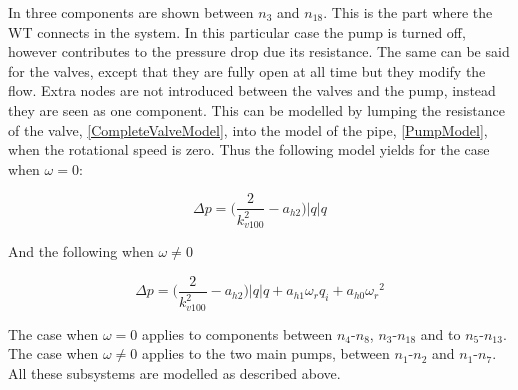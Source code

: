 In  three components are shown between $n_3$ and $n_{18}$. This is the part where the WT connects in the system. In this particular case the pump is turned off, however contributes to the pressure drop due its resistance. The same can be said for the valves, except that they are fully open at all time but they modify the flow. Extra nodes are not introduced between the valves and the pump, instead they are seen as one component. This can be modelled by lumping the resistance of the valve, \eqref{CompleteValveModel}, into the model of the pipe, \eqref{PumpModel}, when the rotational speed is zero. Thus the following model yields for the case when $\omega = 0$:

\begin{equation}
  \Delta p = \Big(\frac{2}{k_{v100}^2} - a_{h2}\Big)|q| q 
  \label{omega_zero}
\end{equation}

And the following when $\omega \neq 0$

\begin{equation}
  \Delta p = \Big(\frac{2}{k_{v100}^2} - a_{h2}\Big)|q| q  + a_{h1} \omega_r q_i + a_{h0}{\omega_r}^2
  \label{omega_notzero}
\end{equation}

The case when $\omega = 0$ applies to components between $n_4$-$n_8$, $n_3$-$n_{18}$  and to $n_5$-$n_{13}$. The case when $\omega \neq 0$ applies to the two main pumps, between $n_1$-$n_2$ and $n_1$-$n_7$. All these subsystems are modelled as described above. 